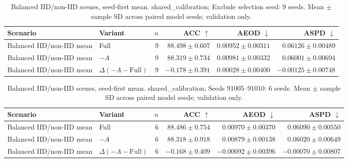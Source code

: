 \begin{table}[t]
\centering
\small
\caption{Balanced IID/non-IID scenes, seed-first mean. shared\_calibration; Exclude selection seed: 9 seeds. Mean $\pm$ sample SD across paired model seeds; validation only.}
\begin{tabular}{llrrrr}
\toprule
Scenario & Variant & $n$ & ACC $\uparrow$ & AEOD $\downarrow$ & ASPD $\downarrow$ \\
\midrule
Balanced IID/non-IID mean & Full & 9 & $88.498 \pm 0.607$ & $0.00952 \pm 0.00311$ & $0.06126 \pm 0.00489$ \\
Balanced IID/non-IID mean & $-A$ & 9 & $88.319 \pm 0.734$ & $0.00981 \pm 0.00332$ & $0.06001 \pm 0.00694$ \\
Balanced IID/non-IID mean & $\Delta(-A-\mathrm{Full})$ & 9 & $-0.178 \pm 0.391$ & $0.00028 \pm 0.00400$ & $-0.00125 \pm 0.00748$ \\
\bottomrule
\end{tabular}
\end{table}

\begin{table}[t]
\centering
\small
\caption{Balanced IID/non-IID scenes, seed-first mean. shared\_calibration; Seeds 91005–91010: 6 seeds. Mean $\pm$ sample SD across paired model seeds; validation only.}
\begin{tabular}{llrrrr}
\toprule
Scenario & Variant & $n$ & ACC $\uparrow$ & AEOD $\downarrow$ & ASPD $\downarrow$ \\
\midrule
Balanced IID/non-IID mean & Full & 6 & $88.486 \pm 0.754$ & $0.00970 \pm 0.00370$ & $0.06090 \pm 0.00550$ \\
Balanced IID/non-IID mean & $-A$ & 6 & $88.318 \pm 0.918$ & $0.00879 \pm 0.00138$ & $0.06020 \pm 0.00649$ \\
Balanced IID/non-IID mean & $\Delta(-A-\mathrm{Full})$ & 6 & $-0.168 \pm 0.409$ & $-0.00092 \pm 0.00396$ & $-0.00070 \pm 0.00807$ \\
\bottomrule
\end{tabular}
\end{table}
